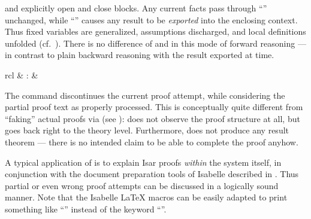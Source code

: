 \begin{isabellebody}
\begin{isamarkuptext}
\begin{description}
  \item \hyperlink{command.braceleft}{\mbox{\isa{\isacommand{{\isacharbraceleft}}}}} and \hyperlink{command.braceright}{\mbox{\isa{\isacommand{{\isacharbraceright}}}}} explicitly open and close
  blocks.  Any current facts pass through ``\hyperlink{command.braceleft}{\mbox{\isa{\isacommand{{\isacharbraceleft}}}}}''
  unchanged, while ``\hyperlink{command.braceright}{\mbox{\isa{\isacommand{{\isacharbraceright}}}}}'' causes any result to be
  \emph{exported} into the enclosing context.  Thus fixed variables
  are generalized, assumptions discharged, and local definitions
  unfolded (cf.\ ).  There is no difference
  of \hyperlink{command.assume}{\mbox{}} and \hyperlink{command.presume}{\mbox{}} in this mode of
  forward reasoning --- in contrast to plain backward reasoning with
  the result exported at \hyperlink{command.show}{\mbox{}} time.

  \end{description}%
\end{isamarkuptext}%
\isamarkuptrue%
%
\isamarkuptrue%
%
\begin{isamarkuptext}%
\begin{matharray}{rcl}
    \hypertarget{command.oops}{\hyperlink{command.oops}{\mbox{}}} & : &  \\
  \end{matharray}

  The \hyperlink{command.oops}{\mbox{}} command discontinues the current proof
  attempt, while considering the partial proof text as properly
  processed.  This is conceptually quite different from ``faking''
  actual proofs via \hyperlink{command.sorry}{\mbox{}} (see
  ): \hyperlink{command.oops}{\mbox{}} does not observe the
  proof structure at all, but goes back right to the theory level.
  Furthermore, \hyperlink{command.oops}{\mbox{}} does not produce any result theorem
  --- there is no intended claim to be able to complete the proof
  anyhow.

  A typical application of \hyperlink{command.oops}{\mbox{}} is to explain Isar proofs
  \emph{within} the system itself, in conjunction with the document
  preparation tools of Isabelle described in .
  Thus partial or even wrong proof attempts can be discussed in a
  logically sound manner.  Note that the Isabelle {\LaTeX} macros can
  be easily adapted to print something like ``\isa{{\isachardoublequote}{\isasymdots}{\isachardoublequote}}'' instead of
  the keyword ``\hyperlink{command.oops}{\mbox{}}''.


\end{isamarkuptext}
\end{isabellebody}
